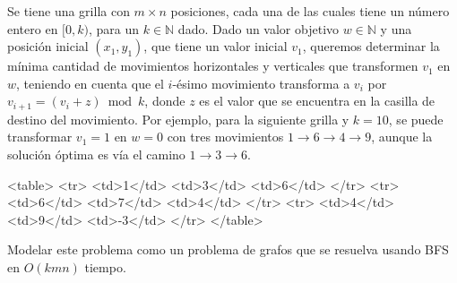 
 \item\Obligatorio Se tiene una grilla con $m \times n$ posiciones, cada una de las cuales tiene un número entero en $[0, k)$, para un $k \in \mathbb{N}$ dado.  Dado un valor objetivo $w \in \mathbb{N}$ y una posición inicial $(x_1, y_1)$, que tiene un valor inicial $v_1$, queremos determinar la mínima cantidad de movimientos horizontales y verticales que transformen $v_1$ en $w$, teniendo en cuenta que el $i$-ésimo movimiento transforma a $v_i$ por $v_{i+1} = (v_i + z) \bmod k$, donde $z$ es el valor que se encuentra en la casilla de destino del movimiento.  Por ejemplo, para la siguiente grilla y $k=10$, se puede transformar $v_1 = 1$ en $w = 0$ con tres movimientos $1 \to 6 \to 4 \to 9$, aunque la solución óptima es vía el camino $1 \to 3 \to 6$.

 <table>
   <tr>
     <td>1</td>
     <td>3</td>
     <td>6</td>
   </tr>
   <tr>
     <td>6</td>
     <td>7</td>
     <td>4</td>
   </tr>
   <tr>
     <td>4</td>
     <td>9</td>
     <td>-3</td>
   </tr>
</table>


 Modelar este problema como un problema de grafos que se resuelva usando BFS en $O(kmn)$ tiempo.  


